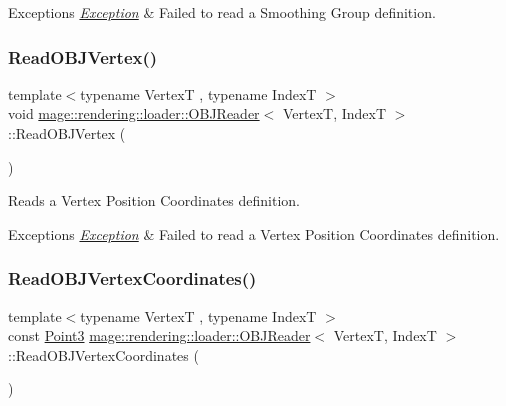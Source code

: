 \begin{DoxyExceptions}{Exceptions}
{\em \mbox{\hyperlink{classmage_1_1_exception}{Exception}}} & Failed to read a Smoothing Group definition. \\
\hline
\end{DoxyExceptions}
\mbox{\label{classmage_1_1rendering_1_1loader_1_1_o_b_j_reader_a0f6e0d744b2baf94bca4dfda6c2cc194}} 
\subsubsection{\texorpdfstring{Read\+O\+B\+J\+Vertex()}{ReadOBJVertex()}}
{\footnotesize\ttfamily template$<$typename VertexT , typename IndexT $>$ \\
void \mbox{\hyperlink{classmage_1_1rendering_1_1loader_1_1_o_b_j_reader}{mage\+::rendering\+::loader\+::\+O\+B\+J\+Reader}}$<$ VertexT, IndexT $>$\+::Read\+O\+B\+J\+Vertex (\begin{DoxyParamCaption}{ }\end{DoxyParamCaption})\hspace{0.3cm}{\ttfamily [private]}}

Reads a Vertex Position Coordinates definition.


\begin{DoxyExceptions}{Exceptions}
{\em \mbox{\hyperlink{classmage_1_1_exception}{Exception}}} & Failed to read a Vertex Position Coordinates definition. \\
\hline
\end{DoxyExceptions}
\mbox{\label{classmage_1_1rendering_1_1loader_1_1_o_b_j_reader_a2c5d954441d64b982d7a89df9171edbc}} 
\subsubsection{\texorpdfstring{Read\+O\+B\+J\+Vertex\+Coordinates()}{ReadOBJVertexCoordinates()}}
{\footnotesize\ttfamily template$<$typename VertexT , typename IndexT $>$ \\
const \mbox{\hyperlink{structmage_1_1_point3}{Point3}} \mbox{\hyperlink{classmage_1_1rendering_1_1loader_1_1_o_b_j_reader}{mage\+::rendering\+::loader\+::\+O\+B\+J\+Reader}}$<$ VertexT, IndexT $>$\+::Read\+O\+B\+J\+Vertex\+Coordinates (\begin{DoxyParamCaption}{ }\end{DoxyParamCaption})\hspace{0.3cm}{\ttfamily [private]}}

